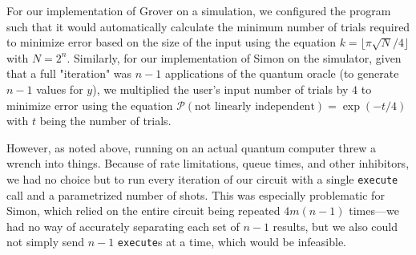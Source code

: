 \documentclass[12pt]{article}
\begin{document}
For our implementation of Grover on a simulation, we configured the program such that it would automatically calculate the minimum number of trials required to minimize error based on the size of the input using the equation $k = \lfloor\pi\sqrt{N}/4\rfloor$ with $N = 2^n$.
Similarly, for our implementation of Simon on the simulator, given that a full "iteration" was $n-1$ applications of the quantum oracle (to generate $n-1$ values for $y$), we multiplied the user's input number of trials by $4$ to minimize error using the equation $\mathcal{P}(\text{not linearly independent}) = \exp(-t/4)$ with $t$ being the number of trials.

However, as noted above, running on an actual quantum computer threw a wrench into things.
Because of rate limitations, queue times, and other inhibitors, we had no choice but to run every iteration of our circuit with a single \texttt{execute} call and a parametrized number of shots.
This was especially problematic for Simon, which relied on the entire circuit being repeated $4m(n-1)$ times---we had no way of accurately separating each set of $n-1$ results, but we also could not simply send $n-1$ \texttt{execute}s at a time, which would be infeasible.

\nocite{pyquil}
\nocite{Qiskit}
\end{document}
